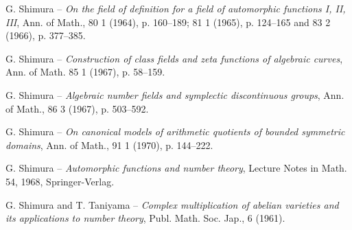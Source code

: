 \documentclass[10pt]{article}
\begin{document}
\begin{description}[leftmargin=3.0em,labelwidth=2.4em,style=nextline]
\item[{[11]}] G. Shimura -- \emph{On the field of definition for a field of automorphic functions I, II, III}, Ann. of Math., 80 1 (1964), p. 160--189; 81 1 (1965), p. 124--165 and 83 2 (1966), p. 377--385.
\item[{[12]}] G. Shimura -- \emph{Construction of class fields and zeta functions of algebraic curves}, Ann. of Math. 85 1 (1967), p. 58--159.
\item[{[13]}] G. Shimura -- \emph{Algebraic number fields and symplectic discontinuous groups}, Ann. of Math., 86 3 (1967), p. 503--592.
\item[{[14]}] G. Shimura -- \emph{On canonical models of arithmetic quotients of bounded symmetric domains}, Ann. of Math., 91 1 (1970), p. 144--222.
\item[{[15]}] G. Shimura -- \emph{Automorphic functions and number theory}, Lecture Notes in Math. 54, 1968, Springer-Verlag.
\item[{[16]}] G. Shimura and T. Taniyama -- \emph{Complex multiplication of abelian varieties and its applications to number theory}, Publ. Math. Soc. Jap., 6 (1961).
\end{description}
\end{document}
